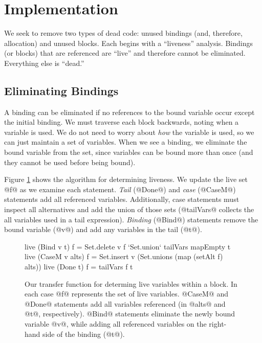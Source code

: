 \documentclass[12pt]{report}
\begin{document}


\section{Implementation}
We seek to remove two types of dead code: unused bindings (and,
therefore, allocation) and unused blocks. Each begins with a
``liveness'' analysis. Bindings (or blocks) that are referenced are ``live''
and therefore cannot be eliminated. Everything else is ``dead.'' 

\subsection{Eliminating Bindings}
\label{ref_sub_elim_bindings}

A binding can be eliminated if no references to the bound variable
occur except the initial binding. We must traverse each block
backwards, noting when a variable is used. We do not need to worry
about \emph{how} the variable is used, so we can just maintain a set
of variables. When we see a binding, we eliminate the bound variable
from the set, since variables can be bound more than once (and they
cannot be used before being bound).


Figure \ref{ref_fig_liveTransfer} shows the algorithm for determining
liveness. We update the live set @f@ as we examine each
statement. \emph{Tail} (@Done@) and \emph{case} (@CaseM@) statements
add all referenced variables. Additionally, case statements must
inspect all alternatives and add the union of those sets (@tailVars@
collects the all variables used in a tail expression). \emph{Binding}
(@Bind@) statements remove the bound variable (@v@) and add any
variables in the tail (@t@).

\begin{figure}[h]
\begin{code}
live (Bind v t) f = Set.delete v f  `Set.union` tailVars mapEmpty t
live (CaseM v alts) f = Set.insert v (Set.unions (map (setAlt f) alts))
live (Done t) f = tailVars f t
\end{code}
\caption{Our transfer function for determing live variables within a block. In
each case @f@ represents the set of live variables. @CaseM@ and @Done@ statements
add all variables referenced (in @alts@ and @t@, respectively). @Bind@ statements
eliminate the newly bound variable @v@, while adding all referenced variables on the
right-hand side of the binding (@t@).}
\label{ref_fig_liveTransfer}
\end{figure}
\end{document}
